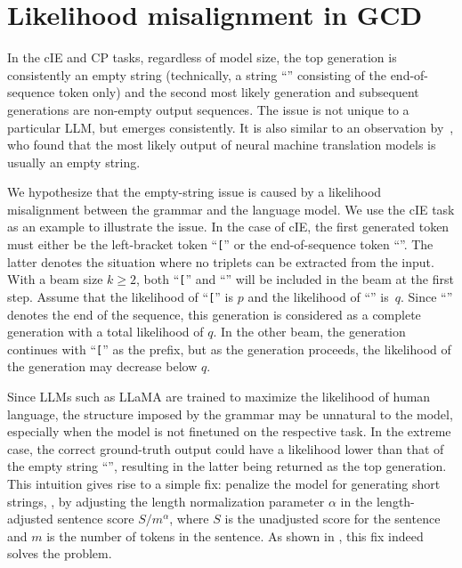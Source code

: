 
\section{Likelihood misalignment in GCD}

In the cIE and CP tasks, regardless of model size, the top generation is consistently an empty string (technically, a string ``\EOS''  consisting of the end-of-sequence token only) and the second most likely generation and subsequent generations are non-empty output sequences.
The issue is not unique to a particular LLM, but emerges consistently.
It is also similar to an observation by~\citet{stahlberg-byrne-2019-nmt}, who found that the most likely output of neural machine translation models is usually an empty string.

We hypothesize that the empty\hyp string issue is caused by a likelihood misalignment between the grammar and the language model.
We use the cIE task as an example to illustrate the issue.
In the case of cIE, the first generated token must either be the left-bracket token ``\texttt{[}'' or the end-of-sequence token ``\EOS''.
The latter denotes the situation where no triplets can be extracted from the input.
With a beam size $k \geq 2$, both ``\texttt{[}'' and ``\EOS'' will be included in the beam at the first step.
Assume that the likelihood of ``\texttt{[}'' is $p$ and the likelihood of ``\EOS'' is~$q$.
Since ``\EOS'' denotes the end of the sequence, this generation is considered as a complete generation with a total likelihood of $q$.
In the other beam, the generation continues with ``\texttt{[}'' as the prefix, but as the generation proceeds, the likelihood of the generation may decrease below $q$.



Since LLMs such as LLaMA are trained to maximize the likelihood of human language, the structure imposed by the grammar may be unnatural to the model, especially when the model is not finetuned on the respective task.
In the extreme case, the correct ground-truth output
could have a likelihood lower than that of the empty string ``\EOS'', resulting in the latter being returned as the top generation.
This intuition gives rise to a simple fix: penalize the model for generating short strings, \eg, by adjusting the length normalization parameter $\alpha$ in the length-adjusted sentence score $S/m^{\alpha}$, where $S$ is the unadjusted score for the sentence and $m$ is the number of tokens in the sentence.
As shown in , this fix indeed solves the problem.

